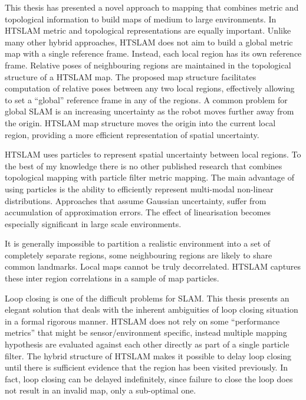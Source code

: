This thesis has presented a novel approach to mapping that combines
metric and topological information to build maps of medium to large
environments. In HTSLAM metric and topological representations are
equally important. Unlike many other hybrid approaches, HTSLAM does
not aim to build a global metric map with a single reference
frame. Instead, each local region has its own reference
frame. Relative poses of neighbouring regions are maintained in the
topological structure of a HTSLAM map. The proposed map structure
facilitates computation of relative poses between any two local
regions, effectively allowing to set a ``global'' reference frame in
any of the regions. A common problem for global SLAM is an increasing
uncertainty as the robot moves further away from the origin. HTSLAM
map structure moves the origin into the current local region,
providing a more efficient representation of spatial uncertainty.

HTSLAM uses particles to represent spatial uncertainty between local
regions. To the best of my knowledge there is no other published
research that combines topological mapping with particle filter metric
mapping. The main advantage of using particles is the ability to
efficiently represent multi-modal non-linear distributions. Approaches
that assume Gaussian uncertainty, suffer from accumulation of
approximation errors. The effect of linearisation becomes especially
significant in large scale environments. 

It is generally impossible to partition a realistic environment into a
set of completely separate regions, some neighbouring regions are
likely to share common landmarks. Local maps cannot be truly
decorrelated. HTSLAM captures these inter region correlations in a
sample of map particles.


Loop closing is one of the difficult problems for SLAM. This thesis
presents an elegant solution that deals with the inherent ambiguities
of loop closing situation in a formal rigorous manner. HTSLAM does not
rely on some ``performance metrics'' that might be sensor/environment
specific, instead multiple mapping hypothesis are evaluated against
each other directly as part of a single particle filter. The hybrid
structure of HTSLAM makes it possible to delay loop closing until
there is sufficient evidence that the region has been visited
previously. In fact, loop closing can be delayed indefinitely, since
failure to close the loop does not result in an invalid map, only a
sub-optimal one.

